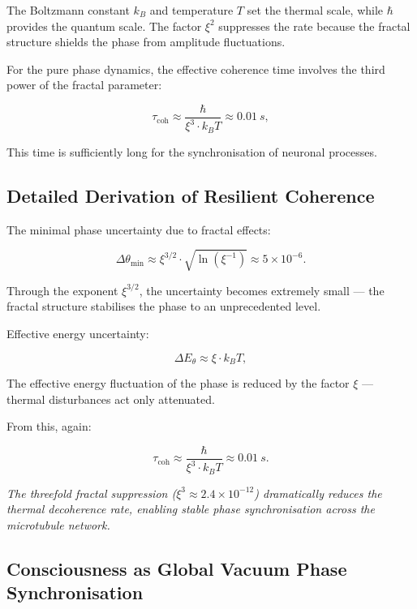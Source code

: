	The Boltzmann constant \(k_B\) and temperature \(T\) set the thermal scale, while \(\hbar\) provides the quantum scale. The factor \(\xi^2\) suppresses the rate because the fractal structure shields the phase from amplitude fluctuations.
	
	For the pure phase dynamics, the effective coherence time involves the third power of the fractal parameter:
	
	\begin{equation}
		\tau_{\text{coh}} \approx \frac{\hbar}{\xi^3 \cdot k_B T} \approx \SI{0.01}{s},
	\end{equation}
	
	This time is sufficiently long for the synchronisation of neuronal processes.
	
	\subsection*{Detailed Derivation of Resilient Coherence}
	
	The minimal phase uncertainty due to fractal effects:
	
	\begin{equation}
		\Delta \theta_{\min} \approx \xi^{3/2} \cdot \sqrt{\ln(\xi^{-1})} \approx 5 \times 10^{-6}.
	\end{equation}
	
	Through the exponent \(\xi^{3/2}\), the uncertainty becomes extremely small — the fractal structure stabilises the phase to an unprecedented level.
	
	Effective energy uncertainty:
	
	\begin{equation}
		\Delta E_{\theta} \approx \xi \cdot k_B T,
	\end{equation}
	
	The effective energy fluctuation of the phase is reduced by the factor \(\xi\) — thermal disturbances act only attenuated.
	
	From this, again:
	
	\begin{equation}
		\tau_{\text{coh}} \approx \frac{\hbar}{\xi^3 \cdot k_B T} \approx \SI{0.01}{s}.
	\end{equation}
	
	\textit{The threefold fractal suppression (\(\xi^3 \approx 2.4 \times 10^{-12}\)) dramatically reduces the thermal decoherence rate, enabling stable phase synchronisation across the microtubule network.}
	
	\subsection*{Consciousness as Global Vacuum Phase Synchronisation}
	
